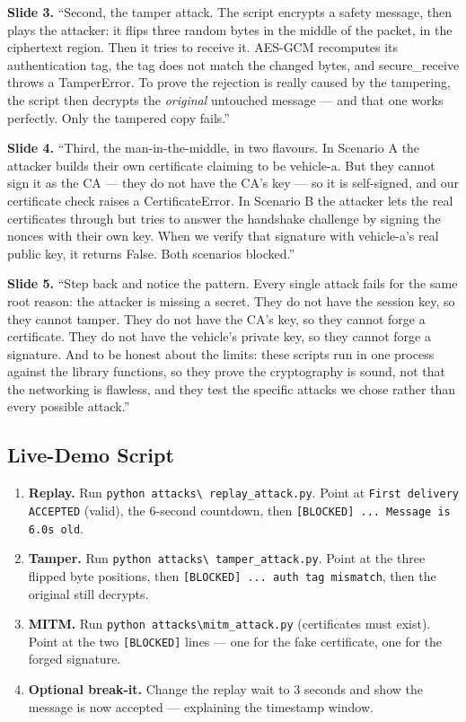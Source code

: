 \documentclass[11pt,a4paper]{article}
\begin{document}
\textbf{Slide 3.} ``Second, the tamper attack. The script encrypts a safety
message, then plays the attacker: it flips three random bytes in the middle of
the packet, in the ciphertext region. Then it tries to receive it. AES-GCM
recomputes its authentication tag, the tag does not match the changed bytes, and
secure\_receive throws a TamperError. To prove the rejection is really caused by
the tampering, the script then decrypts the \emph{original} untouched message ---
and that one works perfectly. Only the tampered copy fails.''

\textbf{Slide 4.} ``Third, the man-in-the-middle, in two flavours. In Scenario A
the attacker builds their own certificate claiming to be vehicle-a. But they
cannot sign it as the CA --- they do not have the CA's key --- so it is
self-signed, and our certificate check raises a CertificateError. In Scenario B
the attacker lets the real certificates through but tries to answer the handshake
challenge by signing the nonces with their own key. When we verify that signature
with vehicle-a's real public key, it returns False. Both scenarios blocked.''

\textbf{Slide 5.} ``Step back and notice the pattern. Every single attack fails
for the same root reason: the attacker is missing a secret. They do not have the
session key, so they cannot tamper. They do not have the CA's key, so they cannot
forge a certificate. They do not have the vehicle's private key, so they cannot
forge a signature. And to be honest about the limits: these scripts run in one
process against the library functions, so they prove the cryptography is sound,
not that the networking is flawless, and they test the specific attacks we chose
rather than every possible attack.''

\subsection{Live-Demo Script}
\begin{enumerate}
  \item \textbf{Replay.} Run \texttt{python attacks\textbackslash
        replay\_attack.py}. Point at \texttt{First delivery ACCEPTED} (valid),
        the 6-second countdown, then \texttt{[BLOCKED] ... Message is 6.0s old}.
  \item \textbf{Tamper.} Run \texttt{python attacks\textbackslash
        tamper\_attack.py}. Point at the three flipped byte positions, then
        \texttt{[BLOCKED] ... auth tag mismatch}, then the original still decrypts.
  \item \textbf{MITM.} Run \texttt{python attacks\textbackslash mitm\_attack.py}
        (certificates must exist). Point at the two \texttt{[BLOCKED]} lines ---
        one for the fake certificate, one for the forged signature.
  \item \textbf{Optional break-it.} Change the replay wait to 3 seconds and show
        the message is now accepted --- explaining the timestamp window.
\end{enumerate}
\end{document}
